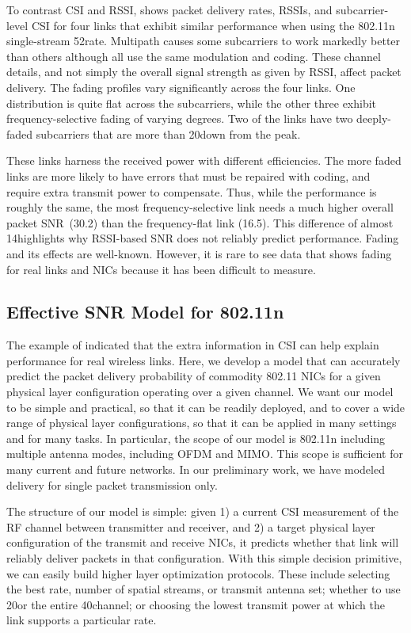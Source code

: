 To contrast CSI and RSSI,  shows packet delivery rates, RSSIs, and subcarrier-level CSI for four links that exhibit similar performance when using the 802.11n single-stream 52\Mbps rate. Multipath causes some subcarriers to work markedly better than others although all use the same modulation and coding. These channel details, and not simply the overall signal strength as given by RSSI, affect packet delivery. The fading profiles vary significantly across the four links. One distribution is quite flat across the subcarriers, while the other three exhibit frequency-selective fading of varying degrees. Two of the links have two deeply-faded subcarriers that are more than 20\dB down from the peak.

These links harness the received power with different efficiencies.
The more faded links are more likely to have errors that must be repaired with coding, and require extra transmit power to compensate. Thus, while the performance is roughly the same, the most frequency-selective link needs a much higher overall packet SNR~(30.2\dB) than the frequency-flat link (16.5\dB). This difference of almost 14\dB highlights why RSSI-based SNR does not reliably predict performance. Fading and its effects are well-known. However, it is rare to see data that shows fading for real links and NICs because it has been difficult to measure.

\subsection{Effective SNR Model for 802.11n}
The example of  indicated that the extra information in CSI can help explain performance for real wireless links. Here, we develop a model that can accurately predict the packet delivery probability of commodity 802.11 NICs for a given physical layer configuration operating over a given channel. We want our model to be simple and practical, so that it can be readily deployed, and to cover a wide range of physical layer configurations, so that it can be applied in many settings and for many tasks. In particular, the scope of our model is 802.11n including multiple antenna modes, including OFDM and MIMO. This scope is sufficient for many current and future networks. In our preliminary work, we have modeled delivery for single packet transmission only.

The structure of our model is simple: given 1) a current CSI measurement of the RF channel between transmitter and receiver, and 2) a target physical layer configuration of the transmit and receive NICs, it predicts whether that link will reliably deliver packets in that configuration.
With this simple decision primitive, we can easily build higher layer optimization protocols. These include selecting the best rate, number of spatial streams, or transmit antenna set; whether to use 20\MHz or the entire 40\MHz channel; or choosing the lowest transmit power at which the link supports a particular rate.

